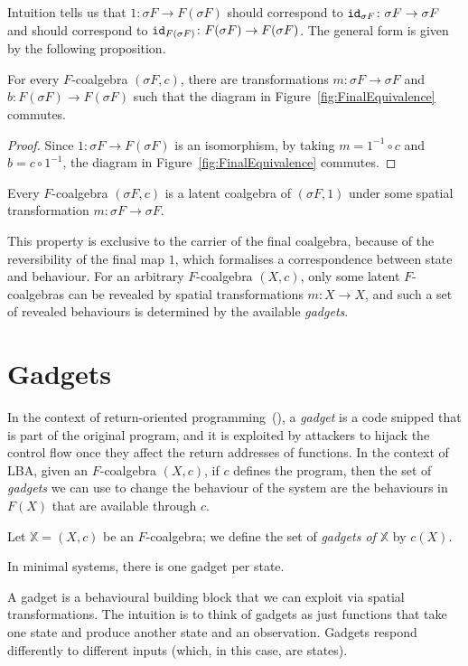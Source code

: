 \begin{definition}
Intuition tells us that $1\colon \sigma F \rightarrow F(\sigma F)$ should correspond to ${\texttt{id}}_{\sigma F}\colon \sigma F\rightarrow \sigma F$ and should correspond to ${\texttt{id}}_{F(\sigma F)}\colon F(\sigma F)\rightarrow F(\sigma F)$. The general form is given by the following proposition.
\begin{proposition}
    For every $F$-coalgebra $(\sigma F, c)$, there are transformations $m\colon \sigma F\rightarrow \sigma F$ and $b\colon F(\sigma F)\rightarrow F(\sigma F)$ such that the diagram in Figure~\ref{fig:FinalEquivalence} commutes.
\end{proposition}
\begin{proof}
    Since $1\colon \sigma F\rightarrow F(\sigma F)$ is an isomorphism, by taking $m=1^{-1}\circ c$ and $b=c\circ 1^{-1}$, the diagram in Figure~\ref{fig:FinalEquivalence} commutes.
\end{proof}
\begin{corollary}
    Every $F$-coalgebra $(\sigma F, c)$ is a latent coalgebra of $(\sigma F, 1)$ under some spatial transformation $m\colon \sigma F\rightarrow \sigma F$.
\end{corollary}
This property is exclusive to the carrier of the final coalgebra, because of the reversibility of the final map $1$, which formalises a correspondence between state and behaviour. For an arbitrary $F$-coalgebra $(X,c)$, only some latent $F$-coalgebras can be revealed by spatial transformations $m\colon X\rightarrow X$, and such a set of revealed behaviours is determined by the available \emph{gadgets}.

\section{Gadgets}
In the context of return-oriented programming~(\cite{ROP}), a \emph{gadget} is a code snipped that is part of the original program, and it is exploited by attackers to hijack the control flow once they affect the return addresses of functions. In the context of LBA, given an $F$-coalgebra $(X,c)$, if $c$ defines the program, then the set of \emph{gadgets} we can use to change the behaviour of the system are the behaviours in $F(X)$ that are available through $c$.
\begin{definition}[Gadgets]
    Let $\mathbb{X}=(X,c)$ be an $F$-coalgebra; %
    we define the set of \emph{gadgets of $\mathbb{X}$} by $c(X)$. 
\end{definition}
\begin{corollary}
    In minimal systems, there is one gadget per state.
\end{corollary}
A gadget is a behavioural building block that we can exploit via spatial transformations. The intuition is to think of gadgets as just functions that take one state and produce another state and an observation.
Gadgets respond differently to different inputs (which, in this case, are states).


\end{definition}
